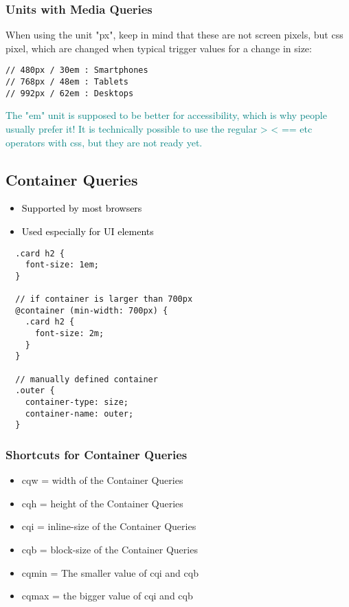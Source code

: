 \documentclass[main.tex,fontsize=8pt,paper=a4,paper=portrait,DIV=calc,]{scrartcl}
\begin{document}
\subsubsection{Units with Media Queries}
When using the unit "px", keep in mind that these are not screen pixels, but css pixel, which are changed when \newline
typical trigger values for a change in size:
\begin{lstlisting}
// 480px / 30em : Smartphones
// 768px / 48em : Tablets
// 992px / 62em : Desktops
\end{lstlisting}
\textcolor{teal}{The "em" unit is supposed to be better for accessibility, which is why people usually prefer it!}\newline
\textcolor{teal}{It is technically possible to use the regular > < == etc operators with css, but they are not ready yet.}

\subsection{Container Queries}
\begin{itemize}
\item \textcolor{black}{Supported by most browsers}
\item \textcolor{black}{Used especially for UI elements}
\end{itemize} 
\begin{lstlisting}
  .card h2 {
    font-size: 1em;
  }
  
  // if container is larger than 700px
  @container (min-width: 700px) {
    .card h2 {
      font-size: 2m;
    }
  }

  // manually defined container
  .outer {
    container-type: size;
    container-name: outer;
  }
\end{lstlisting}

\subsubsection{Shortcuts for Container Queries}
\begin{itemize}
  \item cqw = width of the Container Queries
\item cqh = height of the Container Queries
\item cqi = inline-size of the Container Queries
\item cqb = block-size of the Container Queries
\item cqmin = The smaller value of cqi and cqb
\item cqmax = the bigger value of cqi and cqb
\end{itemize} 
\end{document}
